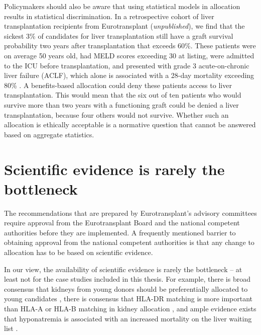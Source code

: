 \documentclass[11pt,twoside,]{book}
\begin{document}
Policymakers should also be aware that using statistical models in allocation
results in statistical discrimination. In a retrospective cohort of liver transplantation
recipients from Eurotransplant (\emph{unpublished}), we find that the sickest 3\% of
candidates for liver transplantation still have a graft survival probability two years
after transplantation that exceeds 60\%. These patients were on average 50 years old, had MELD scores
exceeding 30 at listing, were admitted to the ICU before transplantation, and
presented with grade 3
acute-on-chronic liver failure (ACLF), which alone is associated with a 28-day
mortality exceeding 80\% \citep{Arroyo2020}. A benefits-based allocation could deny
these patients access to liver transplantation. This would mean that the six out of ten
patients who would survive more than two years with a functioning graft could be
denied a liver transplantation, because four others would not survive.
Whether such an allocation is
ethically acceptable is a normative question that cannot be answered based on
aggregate statistics.

\section{Scientific evidence is rarely the bottleneck}\label{scientific-evidence-is-rarely-the-bottleneck}

The recommendations that are prepared by Eurotransplant's advisory committees require approval
from the Eurotransplant Board and the national competent authorities before
they are implemented. A frequently mentioned barrier to obtaining approval from
the national competent authorities is that any change to allocation has to be
based on scientific evidence.

In our view, the availability of scientific evidence is rarely the bottleneck --
at least not for the case studies included in this thesis. For example, there is
broad consensus that kidneys from young donors should be preferentially allocated to young
candidates \citep{waiserAgeMatchingRenal2000, pippiasYoungDeceasedDonor2020, vanittersumIncreasedRiskGraft2017, coemansCompetingRisksModel2024, keithEffectDonorRecipient2004b}, there is consensus that HLA-DR matching
is more important than HLA-A or HLA-B matching in kidney allocation \citep{vereerstraetenExperienceWujciakOpelzAllocation1998, Roberts2004}, and ample evidence exists that hyponatremia is associated
with an increased mortality on the liver waiting list \citep{kimHyponatremiaMortalityPatients2008a, goudsmitValidationModelEndstage2020a}.
\end{document}

